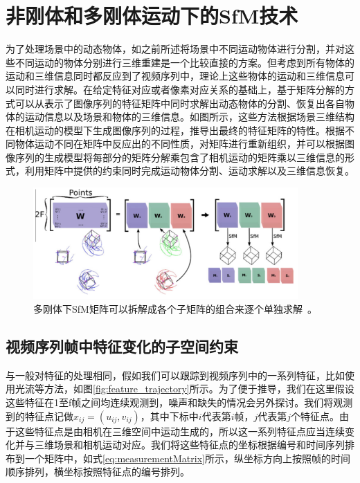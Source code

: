 \section{非刚体和多刚体运动下的SfM技术}
\label{sec:non-rigid_SfM}
为了处理场景中的动态物体，如之前所述将场景中不同运动物体进行分割，并对这些不同运动的物体分别进行三维重建是一个比较直接的方案。但考虑到所有物体的运动和三维信息同时都反应到了视频序列中，理论上这些物体的运动和三维信息可以同时进行求解\cite{Tomasi1992Shape}。在给定特征对应或者像素对应关系的基础上，基于矩阵分解的方式可以从表示了图像序列的特征矩阵中同时求解出动态物体的分割、恢复出各自物体的运动信息以及场景和物体的三维信息。如图\cite{zappella2013joint}所示，这些方法根据场景三维结构在相机运动的模型下生成图像序列的过程，推导出最终的特征矩阵的特性。根据不同物体运动不同在矩阵中反应出的不同性质，对矩阵进行重新组织，并可以根据图像序列的生成模型将每部分的矩阵分解乘包含了相机运动的矩阵乘以三维信息的形式，利用矩阵中提供的约束同时完成运动物体分割、运动求解以及三维信息恢复。

\begin{figure}[thbp]
	\centering
	\includegraphics[width=0.9\textwidth]{figs/1-3/matrix.jpeg}
	\caption{多刚体下SfM矩阵可以拆解成各个子矩阵的组合来逐个单独求解~\cite{fox1999}。}
	\label{fig:rhino}
\end{figure}

\subsection{视频序列帧中特征变化的子空间约束}\label{subsec:subspace}
与一般对特征的处理相同，假如我们可以跟踪到视频序列中的一系列特征，比如使用光流等方法\cite{Fanani2016Keypoint}，如图\ref{fig:feature_trajectory}所示。为了便于推导，我们在这里假设这些特征在1至f帧之间均连续观测到，噪声和缺失的情况会另外探讨。我们将观测到的特征点记做$x_{ij}=(u_{ij},v_{ij})$，其中下标中$i$代表第$i$帧，$j$代表第$j$个特征点。由于这些特征点是由相机在三维空间中运动生成的，所以这一系列特征点应当连续变化并与三维场景和相机运动对应。我们将这些特征点的坐标根据编号和时间序列排布到一个矩阵中，如式\eqref{eq:measurementMatrix}所示，纵坐标方向上按照帧的时间顺序排列，横坐标按照特征点的编号排列。

